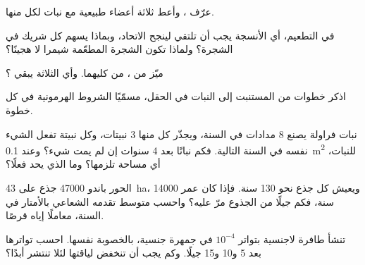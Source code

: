 \begin{exercise}[$\star$]\label{exo:b2:asexual-reproduction:1}
عرّف   ، وأعط ثلاثة أعضاء طبيعية  مع نبات لكل منها.
\end{exercise}

\begin{exercise}[$\star$]\label{exo:b2:asexual-reproduction:2}
في التطعيم، أي الأنسجة يجب أن تلتقي لينجح الاتحاد، وبماذا يسهم كل
شريك في الشجرة؟ ولماذا تكون الشجرة المطعّمة شيمرا لا هجينًا؟
\end{exercise}

\begin{exercise}[$\star$]\label{exo:b2:asexual-reproduction:3}
ميّز  من ،  من
كليهما. وأي الثلاثة يبقي ؟
\end{exercise}

\begin{exercise}[$\star$]\label{exo:b2:asexual-reproduction:4}
اذكر خطوات  من المستنبت إلى النبات في الحقل، مسمّيًا
الشروط الهرمونية في كل خطوة.
\end{exercise}

\begin{exercise}[$\star\star$]\label{exo:b2:asexual-reproduction:5}
نبات فراولة يصنع 8 مدادات في السنة، ويجذّر كل منها 3
نبيتات، وكل نبيتة تفعل الشيء نفسه في السنة التالية.
فكم نباتًا بعد 4 سنوات إن لم يمت شيء؟ وعند \qty{0.1}{m^2} للنبات،
أي مساحة تلزمها؟ وما الذي يحد  فعلًا؟
\end{exercise}

\begin{exercise}[$\star\star$]\label{exo:b2:asexual-reproduction:6}
 الحور باندو \num{47000} جذع على \qty{43}{ha}، ويعيش كل
جذع نحو \num{130} سنة. فإذا كان عمر  \num{14000} سنة،
فكم جيلًا من الجذوع مرّ عليه؟ واحسب متوسط تقدمه الشعاعي بالأمتار في
السنة، معاملًا إياه قرصًا.
\end{exercise}

\begin{exercise}[$\star\star$]\label{exo:b2:asexual-reproduction:7}
تنشأ طافرة لاجنسية بتواتر $10^{-4}$ في جمهرة جنسية، بالخصوبة
نفسها. احسب تواترها بعد 5 و10 و15 جيلًا. وكم يجب أن تنخفض
لياقتها لئلا تنتشر أبدًا؟
\end{exercise}

